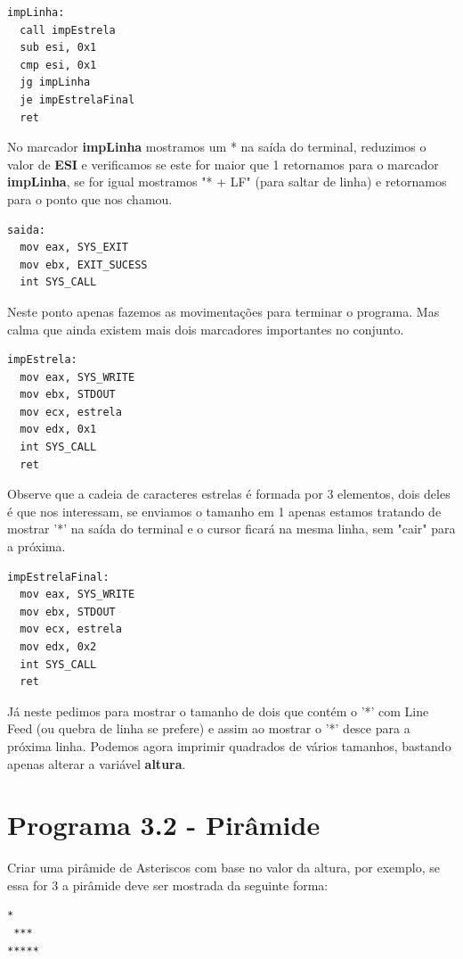 \begin{lstlisting}[]
impLinha:
  call impEstrela
  sub esi, 0x1
  cmp esi, 0x1
  jg impLinha
  je impEstrelaFinal
  ret
\end{lstlisting}

No marcador \textbf{impLinha} mostramos um * na saída do terminal, reduzimos o valor de \textbf{ESI} e verificamos se este for maior que 1 retornamos para o marcador \textbf{impLinha}, se for igual mostramos "* + LF" (para saltar de linha) e retornamos para o ponto que nos chamou.

\begin{lstlisting}[]
saida:
  mov eax, SYS_EXIT
  mov ebx, EXIT_SUCESS
  int SYS_CALL	
\end{lstlisting}

Neste ponto apenas fazemos as movimentações para terminar o programa. Mas calma que ainda existem mais dois marcadores importantes no conjunto.

\begin{lstlisting}[]
impEstrela:
  mov eax, SYS_WRITE
  mov ebx, STDOUT
  mov ecx, estrela
  mov edx, 0x1
  int SYS_CALL
  ret	
\end{lstlisting}

Observe que a cadeia de caracteres estrelas é formada por 3 elementos, dois deles é que nos interessam, se enviamos o tamanho em 1 apenas estamos tratando de mostrar '*' na saída do terminal e o cursor ficará na mesma linha, sem "cair" para a próxima.

\begin{lstlisting}[]
impEstrelaFinal:
  mov eax, SYS_WRITE
  mov ebx, STDOUT
  mov ecx, estrela
  mov edx, 0x2
  int SYS_CALL
  ret	
\end{lstlisting}

Já neste pedimos para mostrar o tamanho de dois que contém o '*' com Line Feed (ou quebra de linha se prefere) e assim ao mostrar o '*' desce para a próxima linha. Podemos agora imprimir quadrados de vários tamanhos, bastando apenas alterar a variável \textbf{altura}.

\section{Programa 3.2 - Pirâmide}
Criar uma pirâmide de Asteriscos com base no valor da altura, por exemplo, se essa for 3 a pirâmide deve ser mostrada da seguinte forma:
\begin{lstlisting}[]
  *
 ***
*****
\end{lstlisting}

